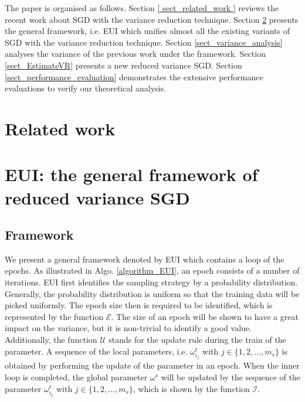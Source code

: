 \documentclass[letterpaper]{article}
\begin{document}
The paper is organised as follows. Section \ref{ sect_related_work } reviews the recent work about SGD with the variance reduction technique. Section \ref{sect_framework}  presents the general framework, i.e. EUI which unifies almost all the existing variants of SGD with the variance reduction technique. Section \ref{sect_variance_analysis} analyses the variance of the previous work under the framework. Section \ref{sect_EstimateVR} presents a new reduced variance SGD.   Section \ref{sect_performance_evaluation} demonstrates the extensive performance evaluations to verify our theoretical analysis. 
 

\section{Related work}

\label{sect_related_work}

\section{EUI: the general framework of reduced variance SGD}
\label{sect_framework}
\subsection{Framework}
We present a general framework denoted by EUI which contains a loop of the epochs. As illustrated in Algo. \ref{algorithm_EUI}, an epoch consists of a number of iterations. EUI first identifies the sampling strategy by a probability distribution. Generally, the probability distribution is uniform so that the training data will be picked uniformly. The epoch size then is required to be identified, which is represented by the function $\mathcal{E}$. The size of an epoch will be shown to have  a great impact on the variance, but it is non-trivial to identify a good value. Additionally, the function $\mathcal{U}$ stands for the update rule during the train of the parameter. A sequence of the local parameters, i.e.  $\omega_{i_{j}}^t$ with $j\in\{1,2,..., m_s\}$ is obtained by performing the update of the parameter in an epoch. When the inner loop is completed, the global parameter $\omega^s$ will be updated by the sequence of the parameter $\omega_{i_{j}}^t$ with $j\in\{1,2,..., m_s\}$, which is shown by the function $\mathcal{I}$. 
\end{document}
